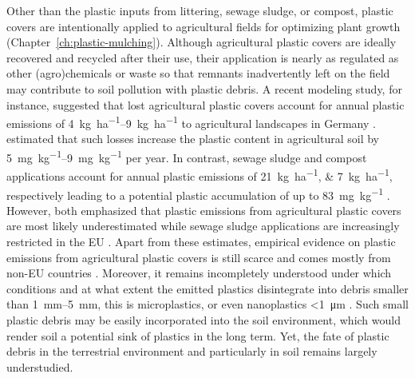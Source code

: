 Other than the plastic inputs from littering, sewage sludge, or compost, plastic covers are intentionally applied to agricultural fields for optimizing plant growth (Chapter~\ref{ch:plastic-mulching}).
Although agricultural plastic covers are ideally recovered and recycled after their use, their application is nearly as regulated as other (agro)chemicals \citep[REACH Regulation,][]{EuropeanParliamentRegulation2006} or waste \citep[Waste Framework Directive,][]{EuropeanParliamentDirective2008} so that remnants inadvertently left on the field may contribute to soil pollution with plastic debris.
A recent modeling study, for instance, suggested that lost agricultural plastic covers account for annual plastic emissions of \SIrange{4}{9}{\kilo\gram\per\hectare} to agricultural landscapes in Germany \citep{BertlingKunststoffe2021}.  estimated that such losses increase the plastic content in agricultural soil by \SIrange{5}{9}{\milli\gram\per\kilo\gram} per year. In contrast, sewage sludge and compost applications account for annual plastic emissions of \SIlist{21;7}{\kilo\gram\per\hectare}, respectively \citep{BertlingKunststoffe2021} leading to a potential plastic accumulation of up to \SI{83}{\milli\gram\per\kilo\gram} \citep{BrandesIdentifying2021}. However, both \citet{BertlingKunststoffe2021,BrandesIdentifying2021} emphasized that plastic emissions from agricultural plastic covers are most likely underestimated while sewage sludge applications are increasingly restricted in the EU \citep{CollivignarelliLegislation2019}.
Apart from these estimates, empirical evidence on plastic emissions from agricultural plastic covers is still scarce and comes mostly from non-EU countries \citep{HuangAgricultural2020,ZhouMicroplastics2020}.
Moreover, it remains incompletely understood under which conditions and at what extent the emitted plastics disintegrate into debris smaller than \SIrange{1}{5}{\milli\meter}, this is microplastics, or even nanoplastics \SI{<1}{\micro\meter} \citep{HartmannAre2019}. Such small plastic debris may be easily incorporated into the soil environment, which would render soil a potential sink of plastics in the long term. Yet, the fate of plastic debris in the terrestrial environment and particularly in soil remains largely understudied.

